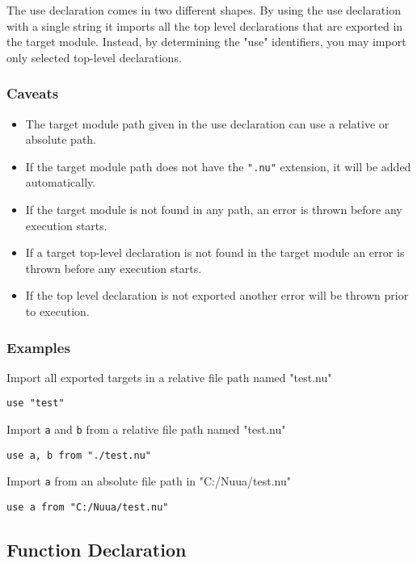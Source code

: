 The use declaration comes in two different shapes. By using the use declaration with a single string it imports all the top level
declarations that are exported in the target module. Instead, by determining the "use" identifiers, you may import only selected top-level
declarations.

\subsubsection{Caveats}

\begin{itemize}
    \item The target module path given in the use declaration can use a relative or absolute path.
    \item If the target module path does not have the \texttt{".nu"} extension, it will be added automatically.
    \item If the target module is not found in any path, an error is thrown before any execution starts.
    \item If a target top-level declaration is not found in the target module an error is thrown before any execution starts.
    \item If the top level declaration is not exported another error will be thrown prior to execution.
\end{itemize}

\subsubsection{Examples}

Import all exported targets in a relative file path named "test.nu"
\begin{lstlisting}
use "test"
\end{lstlisting}
Import \texttt{a} and \texttt{b} from a relative file path named "test.nu"
\begin{lstlisting}
use a, b from "./test.nu"
\end{lstlisting}
Import \texttt{a} from an absolute file path in "C:/Nuua/test.nu"
\begin{lstlisting}
use a from "C:/Nuua/test.nu"
\end{lstlisting}

\subsection{Function Declaration}
\label{sec:statements_function}

